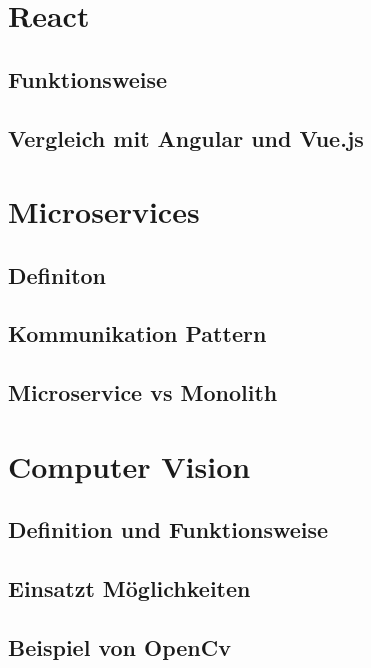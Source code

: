 \section{React}
    \subsection{Funktionsweise}
    \subsection{Vergleich mit Angular und Vue.js}
\section{Microservices}
    \subsection{Definiton}
    \subsection{Kommunikation Pattern}
    \subsection{Microservice vs Monolith}
\section{Computer Vision}
    \subsection{Definition und Funktionsweise}
    \subsection{Einsatzt Möglichkeiten}
    \subsection{Beispiel von OpenCv}